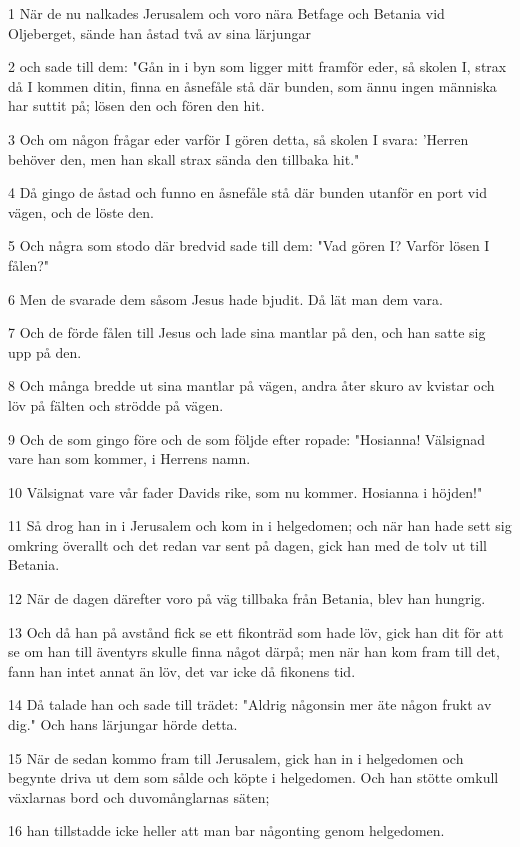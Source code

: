 \par 1 När de nu nalkades Jerusalem och voro nära Betfage och Betania vid Oljeberget, sände han åstad två av sina lärjungar
\par 2 och sade till dem: "Gån in i byn som ligger mitt framför eder, så skolen I, strax då I kommen ditin, finna en åsnefåle stå där bunden, som ännu ingen människa har suttit på; lösen den och fören den hit.
\par 3 Och om någon frågar eder varför I gören detta, så skolen I svara: 'Herren behöver den, men han skall strax sända den tillbaka hit."
\par 4 Då gingo de åstad och funno en åsnefåle stå där bunden utanför en port vid vägen, och de löste den.
\par 5 Och några som stodo där bredvid sade till dem: "Vad gören I? Varför lösen I fålen?"
\par 6 Men de svarade dem såsom Jesus hade bjudit. Då lät man dem vara.
\par 7 Och de förde fålen till Jesus och lade sina mantlar på den, och han satte sig upp på den.
\par 8 Och många bredde ut sina mantlar på vägen, andra åter skuro av kvistar och löv på fälten och strödde på vägen.
\par 9 Och de som gingo före och de som följde efter ropade: "Hosianna! Välsignad vare han som kommer, i Herrens namn.
\par 10 Välsignat vare vår fader Davids rike, som nu kommer. Hosianna i höjden!"
\par 11 Så drog han in i Jerusalem och kom in i helgedomen; och när han hade sett sig omkring överallt och det redan var sent på dagen, gick han med de tolv ut till Betania.
\par 12 När de dagen därefter voro på väg tillbaka från Betania, blev han hungrig.
\par 13 Och då han på avstånd fick se ett fikonträd som hade löv, gick han dit för att se om han till äventyrs skulle finna något därpå; men när han kom fram till det, fann han intet annat än löv, det var icke då fikonens tid.
\par 14 Då talade han och sade till trädet: "Aldrig någonsin mer äte någon frukt av dig." Och hans lärjungar hörde detta.
\par 15 När de sedan kommo fram till Jerusalem, gick han in i helgedomen och begynte driva ut dem som sålde och köpte i helgedomen. Och han stötte omkull växlarnas bord och duvomånglarnas säten;
\par 16 han tillstadde icke heller att man bar någonting genom helgedomen.
